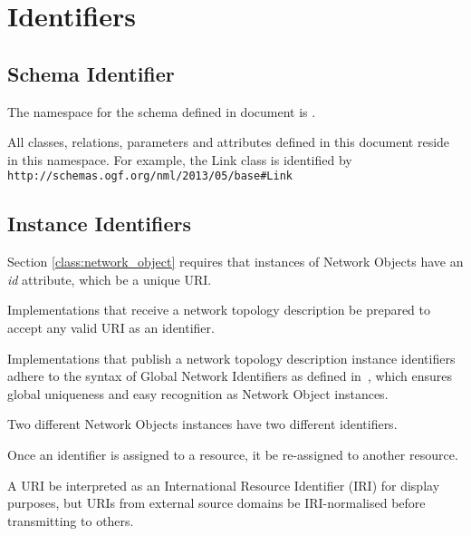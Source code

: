 
\section{Identifiers}%
\label{s:identifiers}

\subsection{Schema Identifier}%
\label{sub:schema_uri}

The namespace for the schema defined in document is .

All classes, relations, parameters and attributes defined in this document reside in this namespace. For example, the Link class is identified by \texttt{http://schemas.ogf.org/nml/2013/05/base\#Link}

\subsection{Instance Identifiers}%
\label{sub:identifiers}

Section \ref{class:network_object} requires that instances of Network Objects \SHOULD{} have an \emph{id} attribute, which \MUST{} be a unique URI.


Implementations that receive a network topology description \MUST{} be prepared to accept any valid URI as an identifier.

Implementations that publish a network topology description instance identifiers \MAY{} adhere to the syntax of Global Network Identifiers as defined in~\cite{gfd.202}, which ensures global uniqueness and easy recognition as Network Object instances.

Two different Network Objects instances \MUST{} have two different identifiers.

Once an identifier is assigned to a resource, it \MUSTNOT{} be re-assigned to another resource.

A URI \MAY{} be interpreted as an International Resource Identifier (IRI) for display purposes, but URIs from external source domains \MUSTNOT{} be IRI-normalised before transmitting to others.

